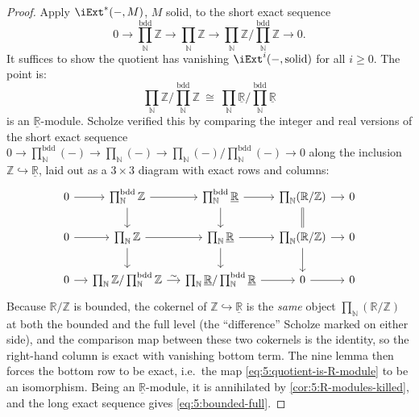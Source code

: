 \begin{proof}
Apply $\iExt^{\ast}(-,M)$, $M$ solid, to the short exact sequence
\begin{equation*}
0\longrightarrow\prod_{\mathbb{N}}^{\mathrm{bdd}}\mathbb{Z}
\longrightarrow\prod_{\mathbb{N}}\mathbb{Z}
\longrightarrow\prod_{\mathbb{N}}\mathbb{Z}\Big/\prod_{\mathbb{N}}^{\mathrm{bdd}}\mathbb{Z}
\longrightarrow0 .
\end{equation*}
It suffices to show the quotient has vanishing $\iExt^{i}(-,\text{solid})$ for all
$i\ge0$. The point is:
\begin{equation}
\label{eq:5:quotient-is-R-module}
\prod_{\mathbb{N}}\mathbb{Z}\Big/\prod_{\mathbb{N}}^{\mathrm{bdd}}\mathbb{Z}
\ \cong\
\prod_{\mathbb{N}}\underline{\mathbb{R}}\Big/\prod_{\mathbb{N}}^{\mathrm{bdd}}
\underline{\mathbb{R}}
\end{equation}
is an $\underline{\mathbb{R}}$-module. Scholze verified this by comparing the
integer and real versions of the short exact sequence
$0\to\prod_{\mathbb{N}}^{\mathrm{bdd}}(-)\to\prod_{\mathbb{N}}(-)\to
\prod_{\mathbb{N}}(-)\big/\prod_{\mathbb{N}}^{\mathrm{bdd}}(-)\to0$ along the
inclusion $\mathbb{Z}\hookrightarrow\underline{\mathbb{R}}$, laid out as a
$3\times3$ diagram with exact rows and columns:
\[
\begin{tikzcd}[row sep=normal, column sep=small]
0 \arrow[r] & \prod_{\mathbb{N}}^{\mathrm{bdd}}\mathbb{Z} \arrow[r]\arrow[d] & \prod_{\mathbb{N}}^{\mathrm{bdd}}\underline{\mathbb{R}} \arrow[r]\arrow[d] & \prod_{\mathbb{N}}(\mathbb{R}/\mathbb{Z}) \arrow[r]\arrow[d, equal] & 0 \\
0 \arrow[r] & \prod_{\mathbb{N}}\mathbb{Z} \arrow[r]\arrow[d] & \prod_{\mathbb{N}}\underline{\mathbb{R}} \arrow[r]\arrow[d] & \prod_{\mathbb{N}}(\mathbb{R}/\mathbb{Z}) \arrow[r]\arrow[d] & 0 \\
0 \arrow[r] & \prod_{\mathbb{N}}\mathbb{Z}/\prod_{\mathbb{N}}^{\mathrm{bdd}}\mathbb{Z} \arrow[r, "\sim"] & \prod_{\mathbb{N}}\underline{\mathbb{R}}/\prod_{\mathbb{N}}^{\mathrm{bdd}}\underline{\mathbb{R}} \arrow[r] & 0 \arrow[r] & 0
\end{tikzcd}
\]
Because $\mathbb{R}/\mathbb{Z}$ is bounded, the cokernel of
$\mathbb{Z}\hookrightarrow\underline{\mathbb{R}}$ is the \emph{same} object
$\prod_{\mathbb{N}}(\mathbb{R}/\mathbb{Z})$ at both the bounded and the full level
(the ``difference'' Scholze marked on either side), and the comparison map between
these two cokernels is the identity, so the right-hand column is exact with
vanishing bottom term. The nine lemma then forces the bottom row to be exact,
i.e.\ the map \eqref{eq:5:quotient-is-R-module} to be an isomorphism. Being an
$\underline{\mathbb{R}}$-module, it is annihilated by
\cref{cor:5:R-modules-killed}, and the long exact sequence gives \eqref{eq:5:bounded-full}.
\end{proof}

